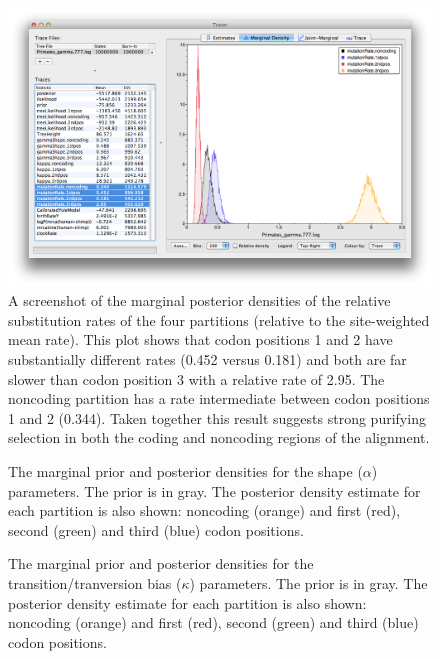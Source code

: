 \documentclass[11pt]{article}
\theoremstyle{plain}%
\theoremstyle{definition}
\theoremstyle{remark}
\begin{document}
\begin{figure}
\includegraphics[width=\textwidth]{figures/Tracer_marginalDensity}
\caption{A screenshot of the marginal posterior densities of the relative substitution rates of the four partitions (relative to the site-weighted mean rate). This plot shows that codon positions 1 and 2 have substantially different rates (0.452 versus 0.181) and both are far slower than codon position 3 with a relative rate of 2.95. The noncoding partition has a rate intermediate between codon positions 1 and 2 (0.344). Taken together this result suggests strong purifying selection in both the coding and noncoding regions of the alignment.}
\label{fig:Tracer_marginalDensity}
\end{figure}


\begin{figure}


\caption{The marginal prior and posterior densities for the shape ($\alpha$) parameters. The prior is in gray. The posterior density estimate for each partition is also shown: noncoding (orange) and first (red), second (green) and third (blue) codon positions.}
\label{fig:primatePriorPosteriorShape}
\end{figure}

\begin{figure}

\caption{The marginal prior and posterior densities for the transition/tranversion bias ($\kappa$) parameters. The prior is in gray. The posterior density estimate for each partition is also shown: noncoding (orange) and first (red), second (green) and third (blue) codon positions.}
\label{fig:primatePriorPosteriorKappa}
\end{figure}
\fi
\end{document}
